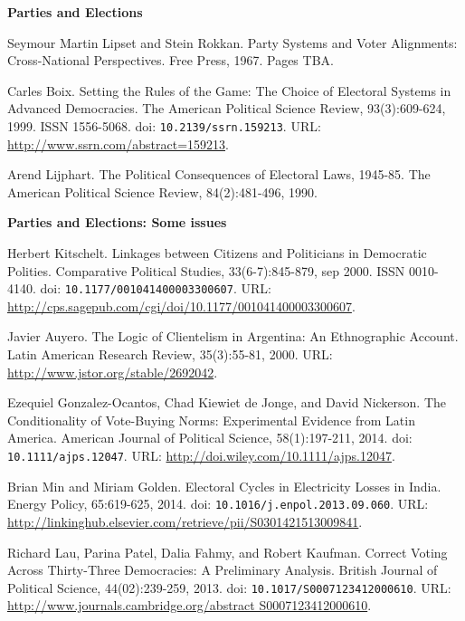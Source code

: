 \documentclass[letterpaper]{article}
\renewenvironment{itemize}{
  \begin{list}{}{
    \setlength{\leftmargin}{1.5em}
  }
}{
  \end{list}
}
\begin{document}
\begin{enumerate}
\item {\bf Parties and Elections}
	\begin{itemize}
		\item[$\bullet$] Seymour Martin Lipset and Stein Rokkan. Party Systems and Voter Alignments: Cross-National Perspectives. Free Press, 1967. Pages TBA.
		\item[$\bullet$] Carles Boix. Setting the Rules of the Game: The Choice of Electoral Systems in Advanced Democracies. The American Political Science Review, 93(3):609-624, 1999. ISSN 1556-5068. doi: \texttt{10.2139/ssrn.159213}. URL: \url{http://www.ssrn.com/abstract=159213}.
		\item[$\bullet$] Arend Lijphart. The Political Consequences of Electoral Laws, 1945-85. The American Political Science Review, 84(2):481-496, 1990.
	\end{itemize}


\item {\bf Parties and Elections: Some issues}
	\begin{itemize}
		\item[$\bullet$] Herbert Kitschelt. Linkages between Citizens and Politicians in Democratic Polities. Comparative Political Studies, 33(6-7):845-879, sep 2000. ISSN 0010-4140. doi: \texttt{10.1177/001041400003300607}. URL: \url{http://cps.sagepub.com/cgi/doi/10.1177/001041400003300607}.
		\item[$\bullet$] Javier Auyero. The Logic of Clientelism in Argentina: An Ethnographic Account. Latin American Research Review, 35(3):55-81, 2000. URL: \url{http://www.jstor.org/stable/2692042}.
		\item[$\bullet$] Ezequiel Gonzalez-Ocantos, Chad Kiewiet de Jonge, and David Nickerson. The Conditionality of Vote-Buying Norms: Experimental Evidence from Latin America. American Journal of Political Science, 58(1):197-211,  2014. doi: \texttt{10.1111/ajps.12047}. URL: \url{http://doi.wiley.com/10.1111/ajps.12047}.
		\item[$\bullet$] Brian Min and Miriam Golden. Electoral Cycles in Electricity Losses in India. Energy Policy, 65:619-625, 2014. doi: \texttt{10.1016/j.enpol.2013.09.060}. URL: \url{http://linkinghub.elsevier.com/retrieve/pii/S0301421513009841}.
		\item[$\bullet$] Richard Lau, Parina Patel, Dalia Fahmy, and Robert Kaufman. Correct Voting Across Thirty-Three Democracies: A Preliminary Analysis. British Journal of Political Science, 44(02):239-259, 2013. doi: \texttt{10.1017/S0007123412000610}. URL: \url{http://www.journals.cambridge.org/abstract S0007123412000610}.
	\end{itemize}





\end{enumerate}
\end{document}
